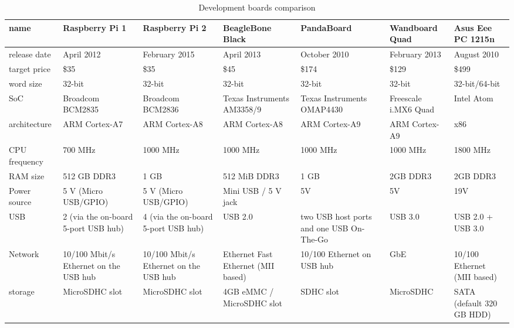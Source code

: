 \documentclass[printmode]{mgr}
\begin{document}
\begin{landscape}

\renewcommand{\arraystretch}{2}
\begin{table}
  \begin{tabular}{| p{2.5cm} | p{3cm} | p{3cm} | p{3.5cm} | p{3.5cm} | p{3cm} | p{3cm} |}
    \hline
    name & Raspberry Pi 1 & Raspberry Pi 2 & BeagleBone Black & PandaBoard & Wandboard Quad & Asus Eee PC 1215n \\
    \hline
    release date & April 2012 & February 2015 & April 2013 & October 2010 & February 2013 & August 2010\\
    \hline
    target price & \$35 & \$35 & \$45 & \$174 & \$129 & \$499\\
    \hline
    word size & 32-bit & 32-bit & 32-bit & 32-bit & 32-bit & 32-bit/64-bit \\
    \hline
    SoC & Broadcom BCM2835 & Broadcom BCM2836 & Texas Instruments AM3358/9 & Texas Instruments OMAP4430 & Freescale i.MX6 Quad & Intel Atom\\
    \hline
    architecture & ARM Cortex-A7 & ARM Cortex-A8 & ARM Cortex-A8 & ARM Cortex-A9 & ARM Cortex-A9 & x86\\
    \hline
    CPU frequency & 700 MHz & 1000 MHz & 1000 MHz & 1000 MHz & 1000 MHz & 1800 MHz\\
    \hline
    RAM size & 512 GB DDR3 & 1 GB & 512 MiB DDR3 & 1 GB & 2GB DDR3 & 2GB DDR3\\
    \hline
    Power source & 5 V (Micro USB/GPIO) & 5 V (Micro USB/GPIO) & Mini USB / 5 V jack & 5V & 5V & 19V\\ %
    \hline
    USB & 2 (via the on-board 5-port USB hub) & 4 (via the on-board 5-port USB hub) & USB 2.0 & two USB host ports and one USB On-The-Go & USB 3.0 & USB 2.0 + USB 3.0\\
    \hline
    Network & 10/100 Mbit/s Ethernet on the USB hub & 10/100 Mbit/s Ethernet on the USB hub  & Ethernet Fast Ethernet (MII based) & 10/100 Ethernet on USB hub & GbE & 10/100 Ethernet (MII based)\\
    \hline
    storage & MicroSDHC slot & MicroSDHC slot & 4GB eMMC / MicroSDHC slot & SDHC slot & MicroSDHC & SATA (default 320 GB HDD)\\
    \hline
  \end{tabular}
  \caption{Development boards comparison}
\end{table}

\end{landscape}
\end{document}
